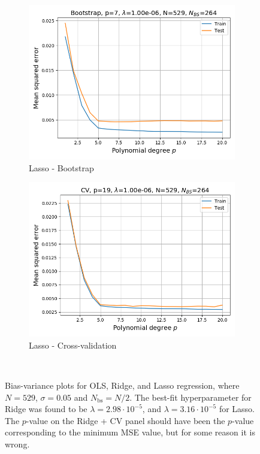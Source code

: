 \documentclass[a4paper]{article}
\begin{document}
\begin{figure}[H]
\begin{subfigure}{0.49\textwidth}
    \includegraphics[scale=0.45]{../figures/task_e/MSE_train_test_Bootstrap_N529_pmax20_nlamb10_noise0.05_seed4155_Lasso_boot_Nbs264_opt1.png}
    \caption{Lasso - Bootstrap}
  \end{subfigure}
  \begin{subfigure}{0.49\textwidth}
    \includegraphics[scale=0.45]{../figures/task_e/MSE_train_test_CV_N529_pmax20_nlamb10_noise0.05_seed4155_Lasso_cv_k5_opt1.png}
    \caption{Lasso - Cross-validation}
  \end{subfigure}\\  
  \caption{Bias-variance plots for OLS, Ridge, and Lasso regression, where $N=529$, $\sigma = 0.05$ and $N_{\text{bs}} = N/2$. The best-fit hyperparameter for Ridge was found to be $\lambda = 2.98\cdot10^{-5}$, and $\lambda = 3.16\cdot10^{-5}$ for Lasso. The $p$-value on the Ridge + CV panel should have been the $p$-value corresponding to the minimum MSE value, but for some reason it is wrong.}
  \label{fig:train_test_franke}
\end{figure}
\end{document}
